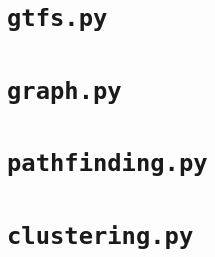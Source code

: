 \documentclass[12pt,english]{article}
\begin{document}
	\section{\texttt{gtfs.py}}\label{sec:code:gtfs}
	

	\section{\texttt{graph.py}}\label{sec:code:graph}
	

	\section{\texttt{pathfinding.py}}\label{sec:code:pathfinding}
	

	\section{\texttt{clustering.py}}\label{sec:code:clustering}
	
\end{document}
